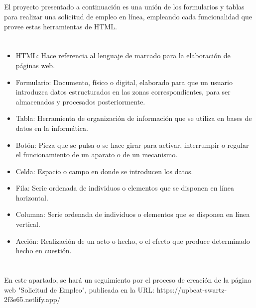 \documentclass[10pt,a4paper]{article}
\begin{document}
\subsection{ \color{colorESCOM}{Trabajo}}
El proyecto presentado a continuación es una unión de los formularios y tablas para realizar una solicitud de empleo en línea, empleando cada funcionalidad que provee estas herramientas de HTML.

\pagebreak

\section{\color{colorIPN}{Conceptos}}

\begin{itemize}
	\item  HTML: Hace referencia al lenguaje de marcado para la elaboración de páginas web.
	\item  Formulario: Documento, físico o digital, elaborado para que un usuario introduzca datos estructurados en las zonas correspondientes, para ser almacenados y procesados posteriormente.
	\item  Tabla: Herramienta de organización de información que se utiliza en bases de datos en la informática.
	\item Botón: Pieza que se pulsa o se hace girar para activar, interrumpir o regular el funcionamiento de un aparato o de un mecanismo.
	\item Celda: Espacio o campo en donde se introducen los datos.
	\item Fila: Serie ordenada de individuos o elementos que se disponen en línea horizontal.
	\item Columna: Serie ordenada de individuos o elementos que se disponen en línea vertical.
	\item Acción: Realización de un acto o hecho, o el efecto que produce determinado hecho en cuestión. 
	
\end{itemize}

\pagebreak

\section{\color{colorIPN}{Desarrollo}}
En este apartado, se hará un seguimiento por el proceso de creación de la página web "Solicitud de Empleo", publicada en la URL: https://upbeat-swartz-2f3e65.netlify.app/
\end{document}
